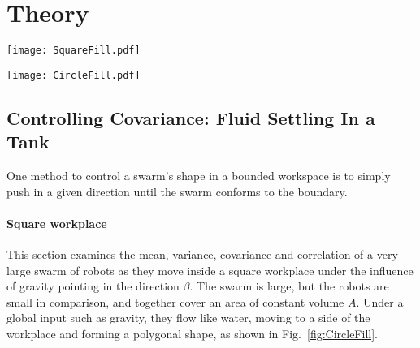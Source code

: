 \section{Theory}
\label{sec:theory}
\begin{figure*}[!htb]
\begin{center}
\texttt{[image: SquareFill.pdf]} 
\caption{Pushing the swarm against a square boundary wall allows limited control of the shape of the swarm, as a function of swarm area $A$ and the commanded movement direction $\beta$. Left plot shows locus of possible mean positions for five values of $A$.  The locus morphs from a square to a circle as $A$ increases.  The covariance ellipse for each $A$ is shown with a dashed line. Center shows two corresponding arrangements of kilobots.  At right is $\bar{x}(A), \sigma_{xy}(A), \sigma_x^2(A),$ and $\rho(A)$ for a range of $\beta$ values. See online interactive demonstration at [withheld for double-blind review].}
\label{fig:CircleFill}
\end{center}
\end{figure*} 
\begin{figure*}[!htb]
\begin{center}
\texttt{[image: CircleFill.pdf]} 
\caption{Pushing the swarm against a circular boundary wall allows limited control of the shape of the swarm, as a function of the fill level $h$ and the commanded movement direction $\beta$. Left plot shows locus of possible mean positions for four values of $h$. The locus of possible mean positions are concentric circles. See online interactive demonstration at [withheld for double-blind review].}
\label{fig:CircleFill}
\end{center}
\end{figure*} 

\subsection{Controlling Covariance: Fluid Settling In a Tank}\label{subsec:FluidInTank}
One method to control a swarm's shape in a bounded workspace is to simply push in a given direction until the swarm conforms to the boundary.
\paragraph{Square workplace}
This section examines the mean, variance,  covariance and correlation of a very large swarm of robots as they move inside a square workplace under the influence of gravity pointing in the direction $\beta$. The swarm is large, but the robots are small in comparison, and together cover an area of constant volume $A$. Under a global input such as gravity, they flow like water, moving to a side of the workplace and forming a polygonal shape, as shown in Fig.~\ref{fig:CircleFill}. 

